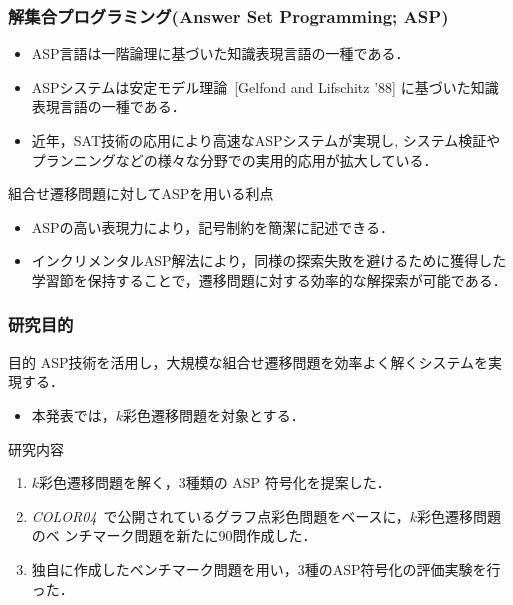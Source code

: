 \documentclass[dvipdfmx,11pt]{beamer}
\begin{document}
\begin{frame}\frametitle{解集合プログラミング(Answer Set Programming; ASP)}

  \begin{itemize}
    \item ASP言語は一階論理に基づいた知識表現言語の一種である．
    \item ASPシステムは安定モデル理論~[Gelfond and Lifschitz '88] に基づいた知識表現言語の一種である．
    \item 近年，SAT技術の応用により高速なASPシステムが実現し, システム検証やプランニングなどの様々な分野での実用的応用が拡大している．
  \end{itemize}

  \begin{alertblock}{組合せ遷移問題に対してASPを用いる利点}
    \begin{itemize}
      \item ASPの高い表現力により，記号制約を簡潔に記述できる．
      \item インクリメンタルASP解法により，同様の探索失敗を避けるために獲得した学習節を保持することで，遷移問題に対する効率的な解探索が可能である．
    \end{itemize}
  \end{alertblock}
  
\end{frame}


\begin{frame}\frametitle{研究目的}
  \begin{alertblock}{目的}
    ASP技術を活用し，大規模な組合せ遷移問題を効率よく解くシステムを実現する．%
  \end{alertblock}
  \begin{itemize}
  \item 本発表では，$k$彩色遷移問題を対象とする．
  \end{itemize}
  \begin{block}{研究内容}
    \begin{enumerate}
    \item $k$彩色遷移問題を解く，3種類の ASP 符号化を提案した．
    \item \textit{COLOR04}~\footnotemark[1]
      で公開されているグラフ点彩色問題をベースに，$k$彩色遷移問題のベ
      ンチマーク問題を新たに90問作成した．
    \item 独自に作成したベンチマーク問題を用い，3種のASP符号化の評価実験を行った．
    \end{enumerate}
  \end{block}
\end{frame}
\end{document}
